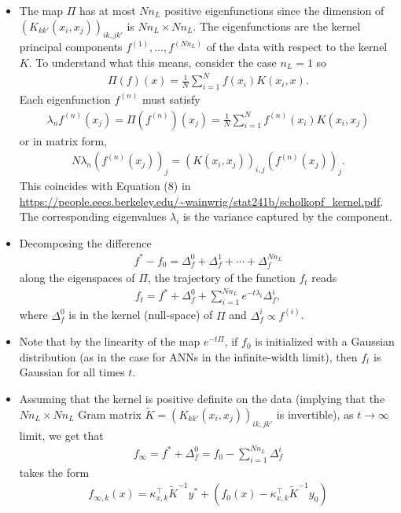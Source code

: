 \documentclass[10pt]{article}
\newcommand{\paran}[1]{{( #1 )}}
\begin{document}
\begin{itemize}
\item The map $\Pi$ has at most $Nn_L$ positive eigenfunctions since the dimension of $(K_{kk'}(x_i,x_j))_{ik,jk'}$ is $Nn_L \times Nn_L$. The eigenfunctions are the kernel principal components $f^\paran{1}, \ldots, f^\paran{Nn_L}$ of the data with respect to the kernel $K$. To understand what this means, consider the case $n_L = 1$ so
\begin{align*}
\Pi(f)(x) = \frac{1}{N} \sum_{i = 1}^N f(x_i) K(x_i,x).
\end{align*}
Each eigenfunction $f^\paran{n}$ must satisfy
\begin{align*}
\lambda_n f^\paran{n}(x_j) = \Pi(f^\paran{n})(x_j) = \frac{1}{N} \sum_{i = 1}^N f^\paran{n}(x_i) K(x_i,x_j)
\end{align*}
or in matrix form,
\begin{align*}
N \lambda_n (f^\paran{n}(x_j))_j = (K(x_i,x_j))_{i,j} (f^\paran{n}(x_j))_j.
\end{align*}
This coincides with Equation (8) in \url{https://people.eecs.berkeley.edu/~wainwrig/stat241b/scholkopf_kernel.pdf}. The corresponding eigenvalues $\lambda_i$ is the variance captured by the component.
\item Decomposing the difference
\begin{align*}
f^* - f_0 = \Delta^0_f + \Delta^1_f + \cdots + \Delta^{Nn_L}_f
\end{align*}
along the eigenspaces of $\Pi$, the trajectory of the function $f_t$ reads
\begin{align*}
f_t = f^* + \Delta^0_f + \sum_{i = 1}^{Nn_L} e^{-t \lambda_i} \Delta^i_f,
\end{align*}
where $\Delta^0_f$ is in the kernel (null-space) of $\Pi$ and $\Delta^i_f \propto f^\paran{i}$.
\item Note that by the linearity of the map $e^{-t\Pi}$, if $f_0$ is initialized with a Gaussian distribution (as in the case for ANNs in the infinite-width limit), then $f_t$ is Gaussian for all times $t$.
\item Assuming that the kernel is positive definite on the data (implying that the $Nn_L \times Nn_L$ Gram matrix $\tilde{K} = (K_{kk'}(x_i,x_j))_{ik,jk'}$ is invertible), as $t \rightarrow \infty$ limit, we get that
\begin{align*}
f_\infty = f^* + \Delta^0_f = f_0 - \sum_{i = 1}^{Nn_L} \Delta^i_f
\end{align*}
takes the form
\begin{align*}
f_{\infty,k}(x) = \kappa^\top_{x,k} \tilde{K}^{-1} y^* + (f_0(x) - \kappa^\top_{x,k} \tilde{K}^{-1} y_0)

\end{align*}
\end{itemize}
\end{document}
